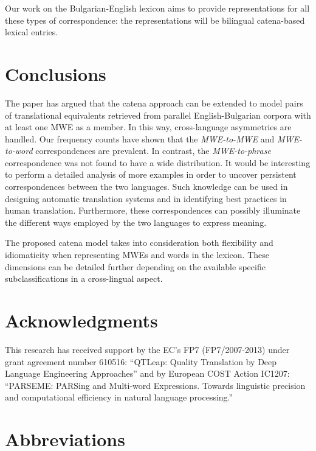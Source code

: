\documentclass[output=paper]{langsci/langscibook}
\begin{document}

Our work on the Bulgarian-English lexicon aims to provide representations
for all these types of correspondence: the representations will be bilingual
catena-based lexical entries.


\section{Conclusions}
\label{Sec:Conclusions}

The paper has argued that the catena approach can be extended to model pairs
of translational equivalents retrieved from parallel English-Bulgarian
corpora with at least one MWE as a member. In this way,
cross-language asymmetries are handled.
Our frequency counts have shown that the {\em MWE-to-MWE} and {\em
MWE-to-word} correspondences are prevalent. In contrast, the {\em
MWE-to-phrase} correspondence was not found to have a wide distribution. It
would be interesting to perform a detailed analysis of more examples in
order to uncover persistent correspondences between the two languages. Such
knowledge can be used in designing automatic translation systems and in
identifying best practices in human translation. Furthermore, these
correspondences can possibly illuminate the different ways employed by the
two languages to express meaning.

The proposed catena model takes into consideration both flexibility and
idiomaticity when representing MWEs and words in the lexicon. These
dimensions can be detailed further depending on the available specific
subclassifications in a cross-lingual aspect.


\section*{Acknowledgments}

This research has received support by the EC's FP7 (FP7/2007-2013) under
grant agreement number 610516: ``QTLeap: Quality Translation by Deep
Language Engineering Approaches'' and by European COST Action IC1207:
``PARSEME: PARSing and Multi-word Expressions. Towards linguistic precision
and computational efficiency in natural language processing.''


\section*{Abbreviations}
\end{document}
